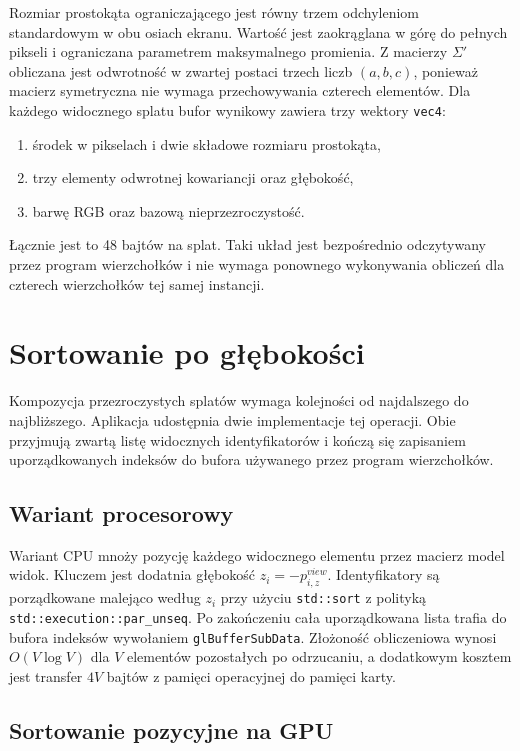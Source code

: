 Rozmiar prostokąta ograniczającego jest równy trzem odchyleniom standardowym w obu osiach ekranu. Wartość jest zaokrąglana w górę do pełnych pikseli i ograniczana parametrem maksymalnego promienia. Z macierzy $\Sigma'$ obliczana jest odwrotność w zwartej postaci trzech liczb $(a,b,c)$, ponieważ macierz symetryczna nie wymaga przechowywania czterech elementów. Dla każdego widocznego splatu bufor wynikowy zawiera trzy wektory \texttt{vec4}:
\begin{enumerate}
  \item środek w pikselach i dwie składowe rozmiaru prostokąta,
  \item trzy elementy odwrotnej kowariancji oraz głębokość,
  \item barwę RGB oraz bazową nieprzezroczystość.
\end{enumerate}
Łącznie jest to 48 bajtów na splat. Taki układ jest bezpośrednio odczytywany przez program wierzchołków  i nie wymaga ponownego wykonywania obliczeń dla czterech wierzchołków tej samej instancji.
\section{Sortowanie po głębokości}
\label{sec:impl_sortowanie}

Kompozycja przezroczystych splatów wymaga kolejności od najdalszego do najbliższego. Aplikacja udostępnia dwie implementacje tej operacji. Obie przyjmują zwartą listę widocznych identyfikatorów i kończą się zapisaniem uporządkowanych indeksów do bufora używanego przez program wierzchołków.

\subsection{Wariant procesorowy}

Wariant CPU mnoży pozycję każdego widocznego elementu przez macierz model \- widok. Kluczem jest dodatnia głębokość $z_i=-p_{i,z}^{view}$. Identyfikatory są porządkowane malejąco według $z_i$ przy użyciu \texttt{std::sort} z polityką \texttt{std::execution::par\_unseq}. Po zakończeniu cała uporządkowana lista trafia do bufora indeksów wywołaniem \texttt{glBufferSubData}. Złożoność obliczeniowa wynosi $O(V\log V)$ dla $V$ elementów pozostałych po odrzucaniu, a dodatkowym kosztem jest transfer $4V$ bajtów z pamięci operacyjnej do pamięci karty.

\subsection{Sortowanie pozycyjne na GPU}
\label{subsec:impl_radix}


